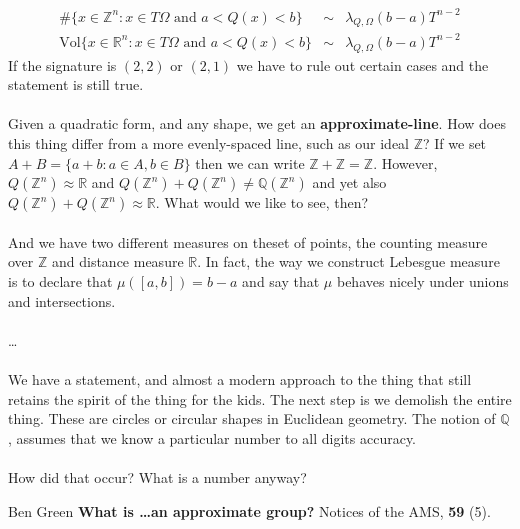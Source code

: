 \documentclass[12pt]{article}
\begin{document}
\begin{eqnarray*}
\#\{ x \in \mathbb{Z}^n : x \in T\Omega \text{ and } a < Q(x) < b \} &\sim & \lambda_{Q, \Omega}(b-a)T^{n-2} \\
\text{Vol}\{ x \in \mathbb{R}^n : x \in T\Omega \text{ and } a < Q(x) < b \} &\sim & \lambda_{Q, \Omega}(b-a)T^{n-2} 
\end{eqnarray*}
If the signature is $(2,2)$ or $(2,1)$ we have to rule out certain cases and the statement is still true. \\ \\
Given a quadratic form, and any shape, we get an \textbf{approximate-line}.  How does this thing differ from a more evenly-spaced line, such as our ideal $\mathbb{Z}$?  If we set $A + B = \{ a + b: a \in A, b \in B\}$ then we can write $\mathbb{Z} + \mathbb{Z} = \mathbb{Z}$.  However, $Q(\mathbb{Z}^n) \approx \mathbb{R}$ and $Q(\mathbb{Z}^n) + Q(\mathbb{Z}^n) \neq \mathbb{Q}(\mathbb{Z}^n)$ and yet also $Q(\mathbb{Z}^n) + Q(\mathbb{Z}^n) \approx \mathbb{R}$.  What would we like to see, then?\\ \\
And we have two different measures on theset of points, the counting measure over $\mathbb{Z}$ and distance measure $\mathbb{R}$.  In fact, the way we construct Lebesgue measure is to declare that $\mu([a,b]) = b-a$ and say that $\mu$ behaves nicely under unions and intersections.  \\ \\ 
\dots  \\ \\
We have a statement, and almost a modern approach to the thing that still retains the spirit of the thing for the kids.  The next step is we demolish the entire thing.  These are circles or circular shapes in Euclidean geometry.  The notion of $\mathbb{Q}$, assumes that we know a particular number to all digits accuracy. \\ \\
How did that occur?  What is a number anyway?

\vfill

\begin{thebibliography}{}

\item Ben Green \textbf{What is \dots an approximate group?} Notices of the AMS, \textbf{59} (5).

\end{thebibliography} 

\newpage 
\end{document}
